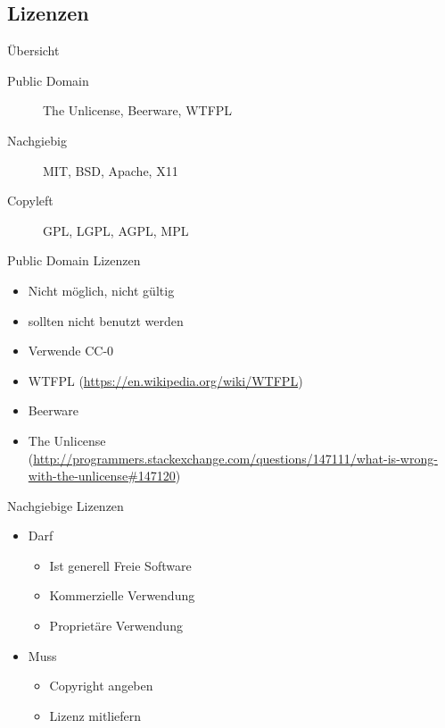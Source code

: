 \subsection{Lizenzen}
\label{sec:lizenzen}
\subsectionframe

\begin{frame}{Übersicht}
	\begin{description}
		\item[Public Domain] The Unlicense, Beerware, WTFPL
		\item[Nachgiebig] MIT, BSD, Apache, X11
		\item[Copyleft] GPL, LGPL, AGPL, MPL
	\end{description}
\end{frame}

\begin{frame}{Public Domain Lizenzen}
	\begin{itemize}
		\item Nicht möglich, nicht gültig
		\item sollten nicht benutzt werden
		\item Verwende CC-0
	\end{itemize}
\end{frame}
\note
{
	\begin{itemize}
		\item WTFPL (\url{https://en.wikipedia.org/wiki/WTFPL})
		\item Beerware
		\item The Unlicense (\url{http://programmers.stackexchange.com/questions/147111/what-is-wrong-with-the-unlicense\#147120})
	\end{itemize}
}

\begin{frame}{Nachgiebige Lizenzen}
	\begin{itemize}
		\item Darf
		\begin{itemize}
			\item Ist generell Freie Software
			\item Kommerzielle Verwendung
			\item Proprietäre Verwendung
		\end{itemize}
		\item Muss
		\begin{itemize}
			\item Copyright angeben
			\item Lizenz mitliefern
		\end{itemize}
	\end{itemize}
\end{frame}

